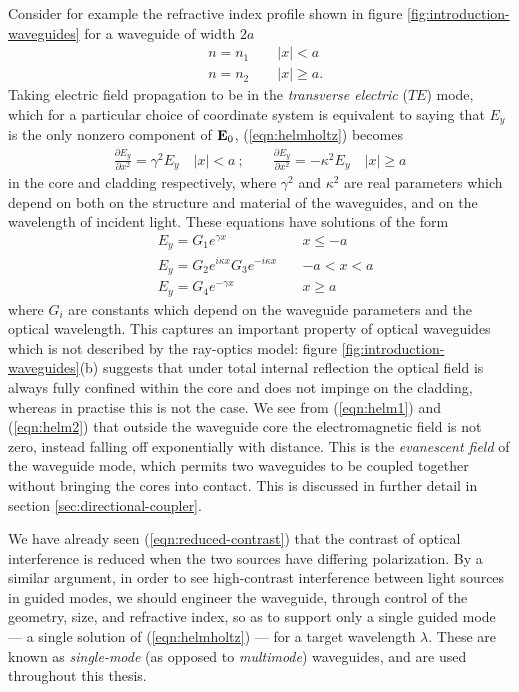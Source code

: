 Consider for example the refractive index profile shown in figure \ref{fig:introduction-waveguides} for a waveguide of width $2a$
\begin{align}
    & n = n_1 \qquad |x| < a \\
    & n = n_2 \qquad |x|\ge a.
\end{align}
Taking electric field propagation to be in the \emph{transverse electric} ($TE$) mode, which for a particular choice of coordinate system is equivalent to saying that $E_y$ is the only nonzero component of $\mathbf{E}_0$, (\ref{eqn:helmholtz}) becomes 
\begin{gather}
    \frac{\partial E_y}{\partial x^2} = \gamma^2 E_y   \quad |x|<a ~; \qquad
    \frac{\partial E_y}{\partial x^2} = - \kappa^2 E_y \quad |x|\ge a
\end{gather}
in the core and cladding respectively, where $\gamma^2$ and $\kappa^2$ are real parameters which depend on both on the structure and material of the waveguides, and on the wavelength of incident light.  These equations have solutions of the form
\begin{align}
    &E_y = G_1 e^{\gamma x} \quad &x \le -a \label{eqn:helm1}\\
    &E_y = G_2 e^{i \kappa x} G_3 e^{-i \kappa x} \quad &-a < x < a\\
    &E_y = G_4 e^{-\gamma x} \quad & x \ge a \label{eqn:helm2}
\end{align}
where $G_i$ are constants which depend on the waveguide parameters and the optical wavelength.  This captures an important property of optical waveguides which is not described by the ray-optics model: figure \ref{fig:introduction-waveguides}(b) suggests that under total internal reflection the optical field is always fully confined within the core and does not impinge on the cladding, whereas in practise this is not the case.  We see from (\ref{eqn:helm1}) and (\ref{eqn:helm2}) that outside the waveguide core the electromagnetic field is not zero, instead falling off exponentially with distance. This is the \emph{evanescent field} of the waveguide mode, which permits two waveguides to be coupled together without bringing the cores into contact. This is discussed in further detail in section \ref{sec:directional-coupler}.

We have already seen (\ref{eqn:reduced-contrast}) that the contrast of optical interference is reduced when the two sources have differing polarization. By a similar argument, in order to see high-contrast interference between light sources in guided modes, we should engineer the waveguide, through control of the geometry, size, and refractive index, so as to support only a single guided mode --- a single solution of (\ref{eqn:helmholtz}) --- for a target wavelength $\lambda$. These are known as \emph{single-mode} (as opposed to \emph{multimode}) waveguides, and are used throughout this thesis.

